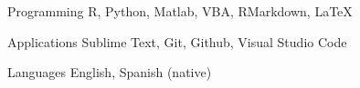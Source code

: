 

\begin{cvskills}

  \cvskill
    {Programming} %
    {R, Python, Matlab, VBA, RMarkdown, \LaTeX} %

\cvskill
  {Applications}
  {Sublime Text, Git, Github, Visual Studio Code}



  \cvskill
    {Languages} %
    {English, Spanish (native)} %

\end{cvskills}
